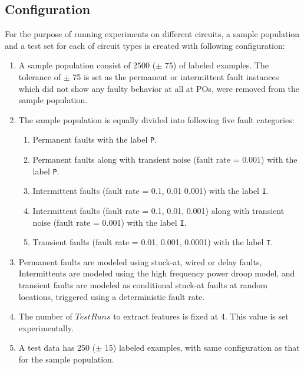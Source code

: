 \subsection{Configuration}
\label{sec:gsp:configuration}
For the purpose of running experiments on different circuits, a sample population and a test set for each of circuit types is created with following configuration:
\begin{enumerate}
  \item A sample population consist of 2500 ($\pm$ 75) of labeled examples. The tolerance of $\pm$ 75 is set as the permanent or intermittent fault instances which did not show any faulty behavior at all at POs, were removed from the sample population.
  \item The sample population is equally divided into following five fault categories:
		\begin{enumerate}
    		\item Permanent faults with the label \texttt{P}.
    		\item Permanent faults along with transient noise (fault rate = 0.001) with the label \texttt{P}.
			\item Intermittent faults (fault rate = 0.1, 0.01 0.001) with the label \texttt{I}.
    		\item Intermittent faults (fault rate = 0.1, 0.01, 0.001) along with transient noise (fault rate = 0.001) with the label \texttt{I}.
			\item Transient faults (fault rate = 0.01, 0.001, 0.0001) with the label \texttt{T}.
 		 \end{enumerate}
	\item Permanent faults are modeled using stuck-at, wired or delay faults, Intermittents are modeled using the high frequency power droop model, and transient faults are modeled as conditional stuck-at faults at random locations, triggered using a deterministic fault rate.
		\item The number of $TestRuns$ to extract features is fixed at 4. This value is set experimentally. 
  \item A test data has 250 ($\pm$ 15) labeled examples, with same configuration as that for the sample population.
\end{enumerate}


